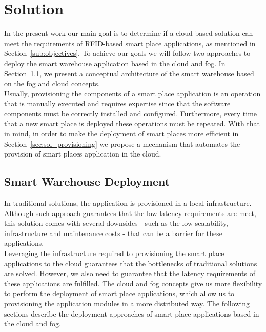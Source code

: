 
\section{Solution}
\label{sec:solution}

In the present work our main goal is to determine if a cloud-based solution can meet the
requirements of RFID-based smart place applications, as mentioned in Section~\ref{sub:objectives}.
To achieve our goals we will follow two approaches to deploy the smart warehouse application based
in the cloud and fog. In Section~\ref{sub:sol_smart_warehouse_deployment}, we present a
conceptual architecture of the smart warehouse based on the fog and cloud concepts.\\

Usually, provisioning the components of a smart place application is an operation that is manually executed and
requires expertise since that the software components must be correctly installed and configured.
Furthermore, every time that a new smart place is deployed these operations must be repeated. With
that in mind, in order to make the deployment of smart places more efficient in Section~\ref{sec:sol_provisioning}
we propose a mechanism that automates the provision of smart places application in the cloud.\\

\subsection{Smart Warehouse Deployment}
\label{sub:sol_smart_warehouse_deployment}
In traditional solutions, the application is provisioned in a local infrastructure. Although such
approach guarantees that the low-latency requirements are meet, this solution comes with several
downsides - such as the low scalability, infrastructure and maintenance costs - that can be a
barrier for these applications.\\

Leveraging the infrastructure required to provisioning the smart place applications to the cloud
guarantees that the bottlenecks of traditional solutions are solved. However, we also need to
guarantee that the latency requirements of these applications are fulfilled. The cloud and fog concepts
give us more flexibility to perform the deployment of smart place applications, which allow us to
provisioning the application modules in a more distributed way. The following sections describe
the deployment approaches of smart place applications based in the cloud and fog.\\

